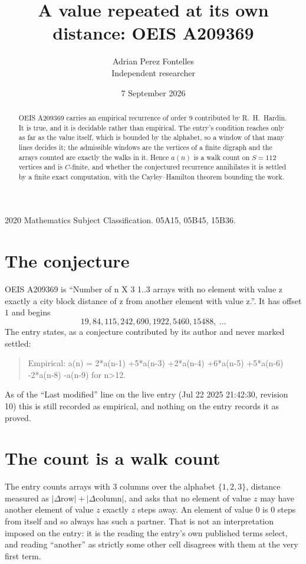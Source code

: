 \documentclass[11pt,a4paper]{article}
\title{A value repeated at its own distance: OEIS A209369}
\author{Adrian Perez Fontelles\\ \small Independent researcher}
\date{7 September 2026}
\theoremstyle{plain}
\theoremstyle{definition}
\begin{document}
\maketitle

\begin{abstract}
OEIS A209369 carries an empirical recurrence of order $9$ contributed by R.~H.~Hardin. It is
true, and it is decidable rather than empirical. The entry's condition reaches only as far as the value itself, which is bounded by the
alphabet, so a window of that many lines decides it; the
admissible windows are the vertices of a finite digraph and the arrays counted are exactly the
walks in it. Hence $a(n)$ is a walk count on $S=112$ vertices and is $C$-finite, and whether the
conjectured recurrence annihilates it is settled by a finite exact computation, with the
Cayley--Hamilton theorem bounding the work.
\end{abstract}

\noindent\small 2020 Mathematics Subject Classification. 05A15, 05B45, 15B36.\normalsize

\section{The conjecture}

OEIS A209369 is ``Number of n X 3 1..3 arrays with no element with value z exactly a city block distance of z from another element with value z.''. It has offset $1$ and begins
\[
19, 84, 115, 242, 690, 1922, 5460, 15488,\ \dots
\]
The entry states, as a conjecture contributed by its author and never marked settled:
\begin{quote}
Empirical: a(n) = 2*a(n-1) +5*a(n-3) +2*a(n-4) +6*a(n-5) +5*a(n-6) -2*a(n-8) -a(n-9) for n>12.
\end{quote}
As of the ``Last modified'' line on the live entry (Jul 22 2025 21:42:30, revision 10) this is still
recorded as empirical, and nothing on the entry records it as proved.

\section{The count is a walk count}

The entry counts arrays with $3$ columns over the alphabet $\{1,2,3\}$, distance measured as $|\Delta \text{row}|+|\Delta \text{column}|$, and asks that no element of value $z$ may have another element of value $z$ exactly $z$ steps away. An element of value $0$ is $0$ steps from itself and so always has such a partner. That is not an interpretation imposed on the entry: it is the reading the entry's own published terms select, and reading ``another'' as strictly some other cell disagrees with them at the very first term.
\end{document}
